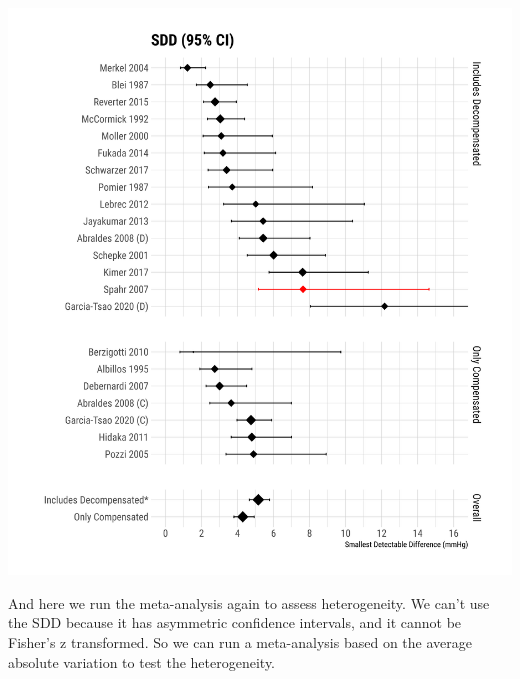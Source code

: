 \documentclass[
]{article}
\begin{document}
\includegraphics{figures/sdd_absolute_forest-1.png}

And here we run the meta-analysis again to assess heterogeneity. We
can't use the SDD because it has asymmetric confidence intervals, and it
cannot be Fisher's z transformed. So we can run a meta-analysis based on
the average absolute variation to test the heterogeneity.
\end{document}
